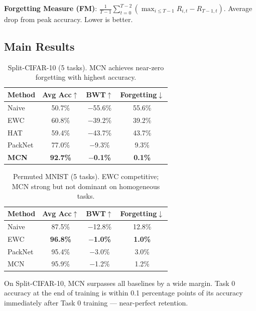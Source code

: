 \documentclass[10pt,twocolumn]{article}
\begin{document}
\textbf{Forgetting Measure (FM)}: $\frac{1}{T-1}\sum_{t=0}^{T-2} (\max_{i \le T-1} R_{i,t} - R_{T-1,t})$. Average drop from peak accuracy. Lower is better.

\subsection{Main Results}

\begin{table}[h]
\centering
\caption{Split-CIFAR-10 (5 tasks). MCN achieves near-zero forgetting with highest accuracy.}
\label{tab:cifar10}
\small
\begin{tabular}{lccc}
\toprule
Method & Avg Acc$\uparrow$ & BWT$\uparrow$ & Forgetting$\downarrow$ \\
\midrule
Naive         & 50.7\%  & $-$55.6\%  & 55.6\% \\
EWC           & 60.8\%  & $-$39.2\%  & 39.2\% \\
HAT           & 59.4\%  & $-$43.7\%  & 43.7\% \\
PackNet       & 77.0\%  & $-$9.3\%   & 9.3\%  \\
\textbf{MCN}  & \textbf{92.7\%} & \textbf{$-$0.1\%} & \textbf{0.1\%} \\
\bottomrule
\end{tabular}
\end{table}

\begin{table}[h]
\centering
\caption{Permuted MNIST (5 tasks). EWC competitive; MCN strong but not dominant on homogeneous tasks.}
\label{tab:mnist}
\small
\begin{tabular}{lccc}
\toprule
Method & Avg Acc$\uparrow$ & BWT$\uparrow$ & Forgetting$\downarrow$ \\
\midrule
Naive         & 87.5\%  & $-$12.8\%  & 12.8\% \\
EWC           & \textbf{96.8\%}  & \textbf{$-$1.0\%}   & \textbf{1.0\%}  \\
PackNet       & 95.4\%  & $-$3.0\%   & 3.0\%  \\
MCN           & 95.9\%  & $-$1.2\%   & 1.2\%  \\
\bottomrule
\end{tabular}
\end{table}

On Split-CIFAR-10, MCN surpasses all baselines by a wide margin. Task 0 accuracy at the end of training is within 0.1 percentage points of its accuracy immediately after Task 0 training --- near-perfect retention.
\end{document}
